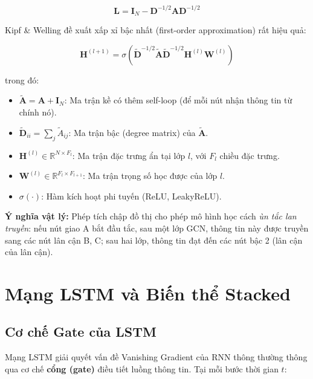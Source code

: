 \begin{equation}
  \mathbf{L} = \mathbf{I}_N - \mathbf{D}^{-1/2}\mathbf{A}\mathbf{D}^{-1/2}
  \label{eq:laplacian}
\end{equation}

Kipf \& Welling \cite{kipf2017gcn} đề xuất xấp xỉ bậc nhất (first-order approximation) rất hiệu quả:

\begin{equation}
  \mathbf{H}^{(l+1)} = \sigma\!\left(\tilde{\mathbf{D}}^{-1/2}\tilde{\mathbf{A}}\tilde{\mathbf{D}}^{-1/2}\mathbf{H}^{(l)}\mathbf{W}^{(l)}\right)
  \label{eq:gcn_update}
\end{equation}

trong đó:
\begin{itemize}[itemsep=3pt]
  \item $\tilde{\mathbf{A}} = \mathbf{A} + \mathbf{I}_N$: Ma trận kề có thêm self-loop (để mỗi nút nhận thông tin từ chính nó).
  \item $\tilde{\mathbf{D}}_{ii} = \sum_j \tilde{A}_{ij}$: Ma trận bậc (degree matrix) của $\tilde{\mathbf{A}}$.
  \item $\mathbf{H}^{(l)} \in \mathbb{R}^{N \times F_l}$: Ma trận đặc trưng ẩn tại lớp $l$, với $F_l$ chiều đặc trưng.
  \item $\mathbf{W}^{(l)} \in \mathbb{R}^{F_l \times F_{l+1}}$: Ma trận trọng số học được của lớp $l$.
  \item $\sigma(\cdot)$: Hàm kích hoạt phi tuyến (ReLU, LeakyReLU).
\end{itemize}

\begin{tcolorbox}[tipbox]
\textbf{Ý nghĩa vật lý:} Phép tích chập đồ thị cho phép mô hình học cách \textit{ùn tắc lan truyền}: nếu nút giao A bắt đầu tắc, sau một lớp GCN, thông tin này được truyền sang các nút lân cận B, C; sau hai lớp, thông tin đạt đến các nút bậc 2 (lân cận của lân cận).
\end{tcolorbox}

\section{Mạng LSTM và Biến thể Stacked}

\subsection{Cơ chế Gate của LSTM}

Mạng LSTM \cite{hochreiter1997lstm} giải quyết vấn đề Vanishing Gradient của RNN thông thường thông qua cơ chế \textbf{cổng (gate)} điều tiết luồng thông tin. Tại mỗi bước thời gian $t$:

